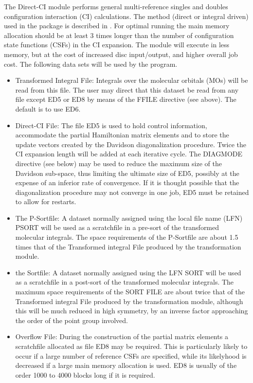 \documentclass[11pt,fleqn]{article}
\begin{document}
The Direct-CI module performs  general multi-reference singles and
doubles configuration interaction (CI) calculations. 
The method (direct or
integral driven) used in the package is described in \cite{ref:19}.
For optimal running the main memory allocation should
be at least 3 times longer than the number of configuration state
functions (CSFs) in the CI expansion. The module will execute
in less memory, but at the cost of increased
disc input/output, and higher overall job cost.
 The following data sets will be used by the program.
\begin{itemize}
\item Transformed Integral File: Integrals over the molecular
orbitals (MOs) will be read from this file. The user may direct
that this dataset be read from any  file except ED5 or ED8
by means of the FFILE directive (see above). The default is to use ED6.
\item Direct-CI File: The file ED5 is used to 
hold control information, accommodate the partial
Hamiltonian matrix elements and to
store the update vectors created by the Davidson diagonalization
procedure. Twice the CI expansion length will be added at each
iterative cycle. The DIAGMODE directive (see below) may be used to
reduce the maximum size of the Davidson sub-space, thus limiting the
ultimate size of ED5, possibly at the expense of an inferior rate of
convergence. If it is thought possible that the
diagonalization procedure may not converge in one job, ED5 must be
retained to allow for restarts.
\item The P-Sortfile: A dataset normally assigned using the 
local file name (LFN) PSORT will be used as a scratchfile 
in a pre-sort of the transformed
molecular integrals. 
The space requirements of the P-Sortfile are about 1.5 times that of the
Transformed integral File  produced by
the transformation module.
\item the Sortfile: A dataset normally assigned using the LFN
SORT will be used as a scratchfile in a post-sort of the transformed
molecular integrals. The maximum
space requirements of the SORT FILE are about twice that of the
Transformed integral File produced by the
transformation module, although this will be much reduced in
high symmetry, by an inverse factor approaching the order of the point group
involved.
\item Overflow File: During the construction of the 
partial matrix elements
a scratchfile allocated as file ED8 may be required.
This is particularly
likely to occur if a large number of reference CSFs are
specified, while its likelyhood is decreased if a large main memory
allocation is used. ED8 is usually of the order 1000 to 4000 blocks
long if it is required.
\end{itemize}
\end{document}
